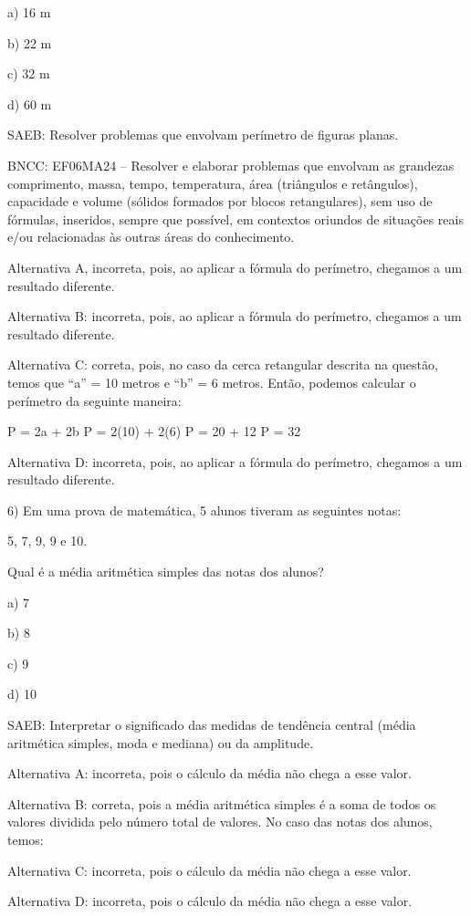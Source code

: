 a) 16 m

b) 22 m

c) 32 m

d) 60 m

SAEB: Resolver problemas que envolvam perímetro de figuras planas.

BNCC: EF06MA24 -- Resolver e elaborar problemas que envolvam as
grandezas comprimento, massa, tempo, temperatura, área (triângulos e
retângulos), capacidade e volume (sólidos formados por blocos
retangulares), sem uso de fórmulas, inseridos, sempre que possível, em
contextos oriundos de situações reais e/ou relacionadas às outras áreas
do conhecimento.

Alternativa A, incorreta, pois, ao aplicar a fórmula do perímetro,
chegamos a um resultado diferente.

Alternativa B: incorreta, pois, ao aplicar a fórmula do perímetro,
chegamos a um resultado diferente.

Alternativa C: correta, pois, no caso da cerca retangular descrita na
questão, temos que ``a'' = 10 metros e ``b'' = 6 metros. Então, podemos
calcular o perímetro da seguinte maneira:

P = 2a + 2b P = 2(10) + 2(6) P = 20 + 12 P = 32

Alternativa D: incorreta, pois, ao aplicar a fórmula do perímetro,
chegamos a um resultado diferente.

6) Em uma prova de matemática, 5 alunos tiveram as seguintes notas:

5, 7, 9, 9 e 10.

Qual é a média aritmética simples das notas dos alunos?

a) 7

b) 8

c) 9

d) 10

SAEB: Interpretar o significado das medidas de tendência central (média
aritmética simples, moda e mediana) ou da amplitude.

Alternativa A: incorreta, pois o cálculo da média não chega a esse
valor.

Alternativa B: correta, pois a média aritmética simples é a soma de
todos os valores dividida pelo número total de valores. No caso das
notas dos alunos, temos:

Alternativa C: incorreta, pois o cálculo da média não chega a esse
valor.

Alternativa D: incorreta, pois o cálculo da média não chega a esse
valor.

